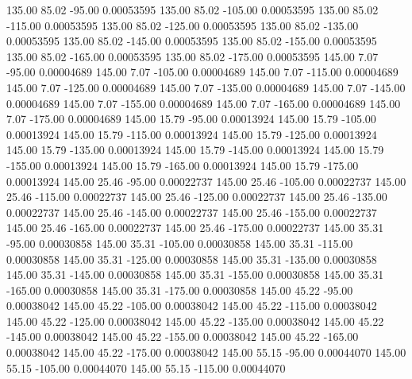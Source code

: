     135.00     85.02    -95.00     0.00053595
    135.00     85.02   -105.00     0.00053595
    135.00     85.02   -115.00     0.00053595
    135.00     85.02   -125.00     0.00053595
    135.00     85.02   -135.00     0.00053595
    135.00     85.02   -145.00     0.00053595
    135.00     85.02   -155.00     0.00053595
    135.00     85.02   -165.00     0.00053595
    135.00     85.02   -175.00     0.00053595
    145.00      7.07    -95.00     0.00004689
    145.00      7.07   -105.00     0.00004689
    145.00      7.07   -115.00     0.00004689
    145.00      7.07   -125.00     0.00004689
    145.00      7.07   -135.00     0.00004689
    145.00      7.07   -145.00     0.00004689
    145.00      7.07   -155.00     0.00004689
    145.00      7.07   -165.00     0.00004689
    145.00      7.07   -175.00     0.00004689
    145.00     15.79    -95.00     0.00013924
    145.00     15.79   -105.00     0.00013924
    145.00     15.79   -115.00     0.00013924
    145.00     15.79   -125.00     0.00013924
    145.00     15.79   -135.00     0.00013924
    145.00     15.79   -145.00     0.00013924
    145.00     15.79   -155.00     0.00013924
    145.00     15.79   -165.00     0.00013924
    145.00     15.79   -175.00     0.00013924
    145.00     25.46    -95.00     0.00022737
    145.00     25.46   -105.00     0.00022737
    145.00     25.46   -115.00     0.00022737
    145.00     25.46   -125.00     0.00022737
    145.00     25.46   -135.00     0.00022737
    145.00     25.46   -145.00     0.00022737
    145.00     25.46   -155.00     0.00022737
    145.00     25.46   -165.00     0.00022737
    145.00     25.46   -175.00     0.00022737
    145.00     35.31    -95.00     0.00030858
    145.00     35.31   -105.00     0.00030858
    145.00     35.31   -115.00     0.00030858
    145.00     35.31   -125.00     0.00030858
    145.00     35.31   -135.00     0.00030858
    145.00     35.31   -145.00     0.00030858
    145.00     35.31   -155.00     0.00030858
    145.00     35.31   -165.00     0.00030858
    145.00     35.31   -175.00     0.00030858
    145.00     45.22    -95.00     0.00038042
    145.00     45.22   -105.00     0.00038042
    145.00     45.22   -115.00     0.00038042
    145.00     45.22   -125.00     0.00038042
    145.00     45.22   -135.00     0.00038042
    145.00     45.22   -145.00     0.00038042
    145.00     45.22   -155.00     0.00038042
    145.00     45.22   -165.00     0.00038042
    145.00     45.22   -175.00     0.00038042
    145.00     55.15    -95.00     0.00044070
    145.00     55.15   -105.00     0.00044070
    145.00     55.15   -115.00     0.00044070
